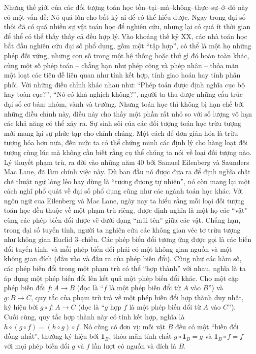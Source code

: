 \begin{multicols}{2}
	Nhưng thế giới của các đối tượng toán học tồn--tại--mà--không--thực--sự--ở--đó này có một vấn đề: Nó quá lớn cho bất kỳ ai để có thể hiểu được. Ngay trong đại số thôi đã có quá nhiều sự vật toán học để nghiên cứu, nhưng lại có quá ít thời gian để thể có thể thấy thấy cả đều hợp lý. Vào khoảng thế kỷ XX, các nhà toán học bắt đầu nghiên cứu đại số phổ dụng,  gồm một ``tập hợp'', có thể là một họ những phép đối xứng, những con số trong một hệ thống hoặc thứ gì đó hoàn toàn khác, cùng một số phép toán -- chẳng hạn như phép cộng và phép nhân -- thỏa mãn một loạt các tiên đề liên quan như tính kết hợp, tính giao hoán hay tính phân phối. Với những điều chỉnh khác nhau như: ``Phép toán được định nghĩa cục bộ hay toàn cục?'', ``Nó có khả nghịch không?'', người ta thu được những cấu trúc đại số cơ bản: nhóm, vành và trường. Nhưng toán học thì không bị hạn chế bởi những điều chỉnh này, điều này cho thấy một phần rất nhỏ so với số lượng vô hạn các khả năng có thể xảy ra.
	\vskip 0.1cm
	Sự sinh sôi của các đối tượng toán học trừu tượng mới mang lại sự phức tạp cho chính chúng. Một cách để đơn giản hóa là trừu tượng hóa hơn nữa, đến mức ta có thể chứng minh các định lý cho hàng loạt đối tượng cùng lúc mà không cần biết rằng cụ thể chúng ta nói về loại đối tượng nào.
	\vskip 0.1cm
	Lý thuyết phạm trù, ra đời vào những năm $40$ bởi Samuel Eilenberg và Saunders Mac Lane, đã làm chính việc này. Dù ban đầu nó được đưa ra để định nghĩa chặt chẽ thuật ngữ lỏng lẻo hay dùng là ``tương đương tự nhiên'', nó còn mang lại một cách nghĩ phổ quát về đại số phổ dụng cũng như các ngành toán học khác. Với ngôn ngữ cua Eilenberg và Mac Lane, ngày nay ta hiểu rằng mỗi loại đối tượng toán học đều thuộc về một phạm trù riêng, được định nghĩa là một họ các ``vật'' cùng các phép biến đổi được vẽ dưới dạng ``mũi tên'' giữa các vật. Chẳng hạn, trong đại số tuyến tính, người ta nghiên cứu các không gian véc tơ trừu tượng như không gian Euclid $3$--chiều. Các phép biến đổi tương ứng được gọi là các biến đổi tuyến tính, và mỗi phép biến đổi phải có một không gian nguồn và một không gian đích (đầu vào và đầu ra của phép biến đổi). Cũng như các hàm số, các phép biến đổi trong một phạm trù có thể ``hợp thành'' với nhau, nghĩa là ta áp dụng một phép biến đổi lên kết quả một phép biến đổi khác. Cho một cặp phép biến đổi $f: A \to B$ (đọc là ``$f$ là một phép biến đổi từ $A$ vào $B$'') và $g: B \to C$, quy tắc của phạm trù trả về một phép biến đổi hợp thành duy nhất, ký hiệu bởi $g \circ f: A \to C$ (đọc là ``$g$ hợp $f$ là một phép biến đổi từ $A$ vào $C$''). Cuối cùng, quy tắc hợp thành này có tính kết hợp, nghĩa là $h \circ (g \circ f) = (h \circ g) \circ f$. Nó cũng có đơn vị: mỗi vật $B$ đều có một ``biến đổi đồng nhất", thường ký hiệu bởi $\pmb{1}_B$, thỏa mãn tính chất $g \!\circ\! \pmb{1}_B \!=\! g$ và $\pmb{1}_B \!\circ\! f \!=\! f$ với mọi phép biến đổi $g$ và $f$ lần lượt có nguồn và đích là $B$. 

\end{multicols}
